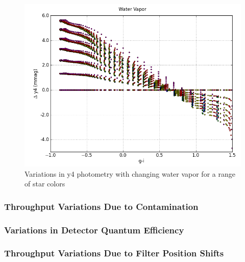 \documentclass[12pt,preprint]{aastex}
\begin{document}
\begin{figure}[htbp]
\includegraphics[width=6in]{AtmoFigs/wv_2}
\caption{ {Variations in y4 photometry with changing water vapor for a range of star colors}
\label{fig:wv_2} }
\end{figure}

\subsubsection{Throughput Variations Due to Contamination}

\subsubsection{Variations in Detector Quantum Efficiency}

\subsubsection{Throughput Variations Due to Filter Position Shifts}
\end{document}
